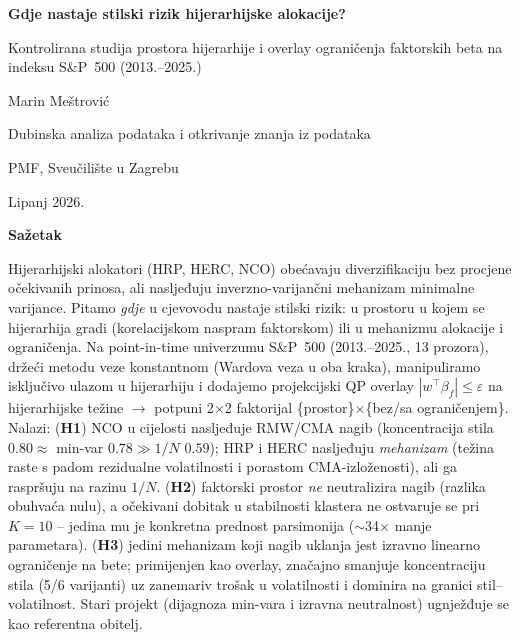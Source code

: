 \documentclass[11pt]{article}
\begin{document}
\thispagestyle{plain}
\begin{center}
  \vspace*{1.0cm}
  {\Large\bfseries Gdje nastaje stilski rizik hijerarhijske alokacije?\par}
  \vspace{0.35cm}
  {\large Kontrolirana studija prostora hijerarhije i overlay ograničenja
  faktorskih beta na indeksu S\&P~500 (2013.--2025.)\par}

  \vfill

  {\large Marin Meštrović\par}
  \vspace{0.35cm}
  {\normalsize Dubinska analiza podataka i otkrivanje znanja iz podataka\par}
  {\normalsize PMF, Sveučilište u Zagrebu\par}
  \vspace{0.35cm}
  {\normalsize Lipanj 2026.\par}

  \vfill

  {\bfseries Sažetak\par}
  \vspace{0.55em}
  \begin{minipage}{0.86\textwidth}
    \small
    Hijerarhijski alokatori (HRP, HERC, NCO) obećavaju diverzifikaciju bez
    procjene očekivanih prinosa, ali nasljeđuju inverzno-varijančni mehanizam
    minimalne varijance. Pitamo \emph{gdje} u cjevovodu nastaje stilski rizik:
    u prostoru u kojem se hijerarhija gradi (korelacijskom naspram faktorskom)
    ili u mehanizmu alokacije i ograničenja. Na point-in-time univerzumu
    S\&P~500 (2013.--2025., 13 prozora), držeći metodu veze konstantnom
    (Wardova veza u oba kraka), manipuliramo isključivo ulazom u hijerarhiju i
    dodajemo projekcijski QP overlay $|w^{\!\top}\beta_f|\le\varepsilon$ na
    hijerarhijske težine $\rightarrow$ potpuni 2$\times$2 faktorijal
    \{prostor\}$\times$\{bez/sa ograničenjem\}. Nalazi: (\textbf{H1}) NCO u
    cijelosti nasljeđuje RMW/CMA nagib (koncentracija stila $0.80\approx$ min-var
    $0.78\gg 1/N$ $0.59$); HRP i HERC nasljeđuju \emph{mehanizam} (težina raste
    s padom rezidualne volatilnosti i porastom CMA-izloženosti), ali ga
    raspršuju na razinu $1/N$. (\textbf{H2}) faktorski prostor \emph{ne}
    neutralizira nagib (razlika obuhvaća nulu), a očekivani dobitak u stabilnosti
    klastera ne ostvaruje se pri $K=10$ -- jedina mu je konkretna prednost
    parsimonija ($\sim$34$\times$ manje parametara). (\textbf{H3}) jedini
    mehanizam koji nagib uklanja jest izravno linearno ograničenje na bete;
    primijenjen kao overlay, značajno smanjuje koncentraciju stila (5/6
    varijanti) uz zanemariv trošak u volatilnosti i dominira na granici
    stil--volatilnost. Stari projekt (dijagnoza min-vara i izravna neutralnost)
    ugnježđuje se kao referentna obitelj.
  \end{minipage}
  \vspace*{1.0cm}
\end{center}
\end{document}

